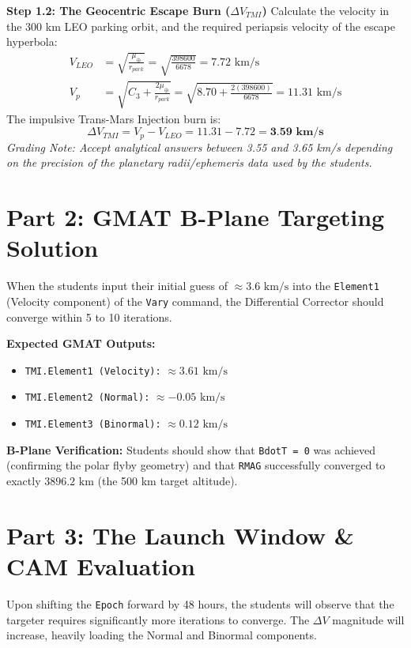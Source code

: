 \documentclass[11pt, letterpaper]{article}
\begin{document}
\textbf{Step 1.2: The Geocentric Escape Burn ($\Delta V_{TMI}$)}
Calculate the velocity in the 300 km LEO parking orbit, and the required periapsis velocity of the escape hyperbola:
\begin{align*}
    V_{LEO} &= \sqrt{\frac{\mu_\oplus}{r_{park}}} = \sqrt{\frac{398600}{6678}} = 7.72 \text{ km/s} \\
    V_{p} &= \sqrt{C_3 + \frac{2\mu_\oplus}{r_{park}}} = \sqrt{8.70 + \frac{2(398600)}{6678}} = 11.31 \text{ km/s}
\end{align*}
The impulsive Trans-Mars Injection burn is:
\begin{equation}
    \Delta V_{TMI} = V_{p} - V_{LEO} = 11.31 - 7.72 = \textbf{3.59 km/s}
\end{equation}
\textit{Grading Note: Accept analytical answers between 3.55 and 3.65 km/s depending on the precision of the planetary radii/ephemeris data used by the students.}

\section*{Part 2: GMAT B-Plane Targeting Solution}

When the students input their initial guess of $\approx 3.6 \text{ km/s}$ into the \texttt{Element1} (Velocity component) of the \texttt{Vary} command, the Differential Corrector should converge within 5 to 10 iterations.

\textbf{Expected GMAT Outputs:}
\begin{itemize}
    \item \texttt{TMI.Element1 (Velocity):} $\approx 3.61 \text{ km/s}$
    \item \texttt{TMI.Element2 (Normal):} $\approx -0.05 \text{ km/s}$
    \item \texttt{TMI.Element3 (Binormal):} $\approx 0.12 \text{ km/s}$
\end{itemize}

\textbf{B-Plane Verification:}
Students should show that \texttt{BdotT = 0} was achieved (confirming the polar flyby geometry) and that \texttt{RMAG} successfully converged to exactly $3896.2 \text{ km}$ (the 500 km target altitude).

\section*{Part 3: The Launch Window \& CAM Evaluation}

Upon shifting the \texttt{Epoch} forward by 48 hours, the students will observe that the targeter requires significantly more iterations to converge. The $\Delta V$ magnitude will increase, heavily loading the Normal and Binormal components.
\end{document}
